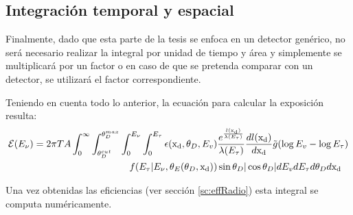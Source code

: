 	\subsection{Integraci\'on temporal y espacial}
	Finalmente, dado que esta parte de la tesis se enfoca en un detector gen\'erico, no ser\'a necesario realizar la integral por unidad de tiempo y \'area y simplemente se multiplicar\'a por un factor  o en caso de que se pretenda comparar con un detector, se utilizar\'a el factor correspondiente.
	
	Teniendo en cuenta todo lo anterior, la ecuaci\'on para calcular la exposici\'on resulta:
	\begin{equation}
		\begin{aligned}
			{\cal E} (E_\nu) = 2 \pi T A
			\int_{0}^{\infty} 
			\int_{\theta_D^{cut}}^{\theta_D^{max}} 
			\int_{0}^{E_\nu} 
			\int_{0}^{E_\tau} 
			\epsilon ({\rm x_d},\theta_D,E_v)& 
			\frac{e^{\frac{l({\rm x_d})}{\lambda(E_\tau)}}}{\lambda(E_\tau)}\frac{dl({\rm x_d})}{d{\rm x_d}}
			\tilde{g}(\log E_v-\log E_\tau)\\
			f(E_\tau|E_\nu,\theta_E(\theta_D,{\rm x_d}))
			&\sin \theta_D |\cos \theta_D|
			dE_v dE_\tau  d\theta_D d{\rm x_d}
		\end{aligned}
		\label{eq:exp2ESRadio}
	\end{equation}

	Una vez obtenidas las eficiencias (ver secci\'on \ref{sc:effRadio}) esta integral se computa num\'ericamente.
	
	
